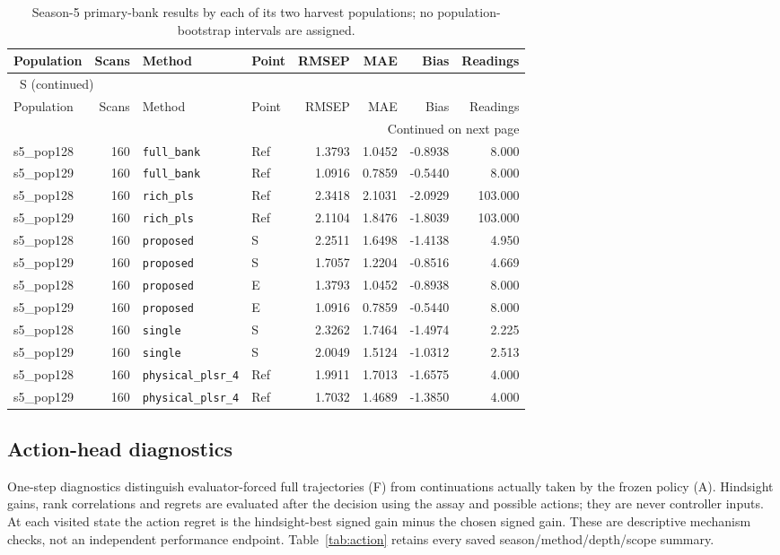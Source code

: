 \documentclass[10pt,a4paper]{article}
\renewcommand{\thetable}{S\arabic{table}}
\begin{document}
\clearpage
\begin{landscape}
\begingroup\footnotesize
\setlength{\tabcolsep}{3.5pt}
\renewcommand{\arraystretch}{1.10}
\begin{longtable}{lrllrrrr}
\caption{Season-5 primary-bank results by each of its two harvest populations; no population-bootstrap intervals are assigned.}\label{tab:season5groups}\\
\toprule
Population & Scans & Method & Point & RMSEP & MAE & Bias & Readings \\
\midrule
\endfirsthead
\multicolumn{8}{l}{\tablename~\thetable{} (continued)}\\
\toprule
Population & Scans & Method & Point & RMSEP & MAE & Bias & Readings \\
\midrule
\endhead
\midrule
\multicolumn{8}{r}{Continued on next page}\\
\endfoot
\bottomrule
\endlastfoot
s5\_pop128 & 160 & \texttt{full\_bank} & Ref & 1.3793 & 1.0452 & -0.8938 & 8.000 \\
s5\_pop129 & 160 & \texttt{full\_bank} & Ref & 1.0916 & 0.7859 & -0.5440 & 8.000 \\
s5\_pop128 & 160 & \texttt{rich\_pls} & Ref & 2.3418 & 2.1031 & -2.0929 & 103.000 \\
s5\_pop129 & 160 & \texttt{rich\_pls} & Ref & 2.1104 & 1.8476 & -1.8039 & 103.000 \\
s5\_pop128 & 160 & \texttt{proposed} & S & 2.2511 & 1.6498 & -1.4138 & 4.950 \\
s5\_pop129 & 160 & \texttt{proposed} & S & 1.7057 & 1.2204 & -0.8516 & 4.669 \\
s5\_pop128 & 160 & \texttt{proposed} & E & 1.3793 & 1.0452 & -0.8938 & 8.000 \\
s5\_pop129 & 160 & \texttt{proposed} & E & 1.0916 & 0.7859 & -0.5440 & 8.000 \\
s5\_pop128 & 160 & \texttt{single} & S & 2.3262 & 1.7464 & -1.4974 & 2.225 \\
s5\_pop129 & 160 & \texttt{single} & S & 2.0049 & 1.5124 & -1.0312 & 2.513 \\
s5\_pop128 & 160 & \texttt{physical\_plsr\_4} & Ref & 1.9911 & 1.7013 & -1.6575 & 4.000 \\
s5\_pop129 & 160 & \texttt{physical\_plsr\_4} & Ref & 1.7032 & 1.4689 & -1.3850 & 4.000 \\
\end{longtable}
\endgroup
\end{landscape}

\subsection{Action-head diagnostics}
One-step diagnostics distinguish evaluator-forced full trajectories (F) from continuations actually taken by the frozen policy (A). Hindsight gains, rank correlations and regrets are evaluated after the decision using the assay and possible actions; they are never controller inputs. At each visited state the action regret is the hindsight-best signed gain minus the chosen signed gain. These are descriptive mechanism checks, not an independent performance endpoint. Table~\ref{tab:action} retains every saved season/method/depth/scope summary.
\end{document}
